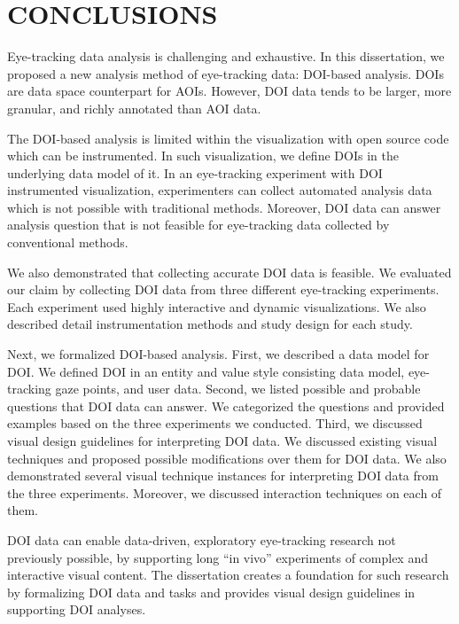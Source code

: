 \chapter{CONCLUSIONS}
\label{chap:Conclusion}
Eye-tracking data analysis is challenging and exhaustive. In this dissertation, we proposed a new analysis method of eye-tracking data: DOI-based analysis. DOIs are data space counterpart for AOIs. However, DOI data tends to be larger, more granular, and richly annotated than AOI data. 

The DOI-based analysis is limited within the visualization with open source code which can be instrumented. In such visualization, we define DOIs in the underlying data model of it. In an eye-tracking experiment with DOI instrumented visualization, experimenters can collect automated analysis data which is not possible with traditional methods. Moreover, DOI data can answer analysis question that is not feasible for eye-tracking data collected by conventional methods. 

We also demonstrated that collecting accurate DOI data is feasible. We evaluated our claim by collecting DOI data from three different eye-tracking experiments. Each experiment used highly interactive and dynamic visualizations. We also described detail instrumentation methods and study design for each study.

Next, we formalized DOI-based analysis. First, we described a data model for DOI. We defined DOI in an entity and value style consisting data model, eye-tracking gaze points, and user data. Second, we listed possible and probable questions that DOI data can answer. We categorized the questions and provided examples based on the three experiments we conducted. Third, we discussed visual design guidelines for interpreting DOI data. We discussed existing visual techniques and proposed possible modifications over them for DOI data. We also demonstrated several visual technique instances for interpreting DOI data from the three experiments. Moreover, we discussed interaction techniques on each of them.

DOI data can enable data-driven, exploratory eye-tracking research not previously possible, by supporting long ``in vivo'' experiments of complex and interactive visual content. The dissertation creates a foundation for such research by formalizing DOI data and tasks and provides visual design guidelines in supporting DOI analyses.